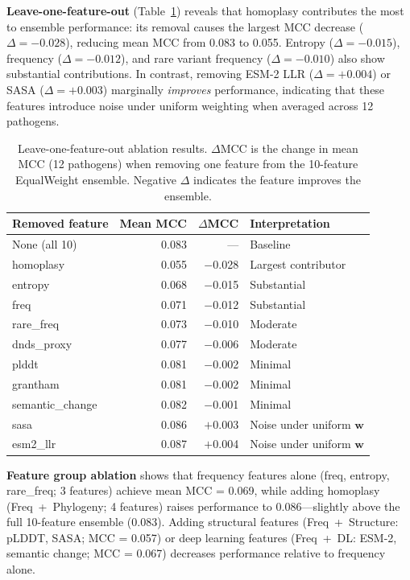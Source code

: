 \textbf{Leave-one-feature-out} (Table~\ref{tab:feature_ablation_adapt}) reveals that homoplasy contributes the most to ensemble performance: its removal causes the largest MCC decrease ($\Delta = -0.028$), reducing mean MCC from 0.083 to 0.055.
Entropy ($\Delta = -0.015$), frequency ($\Delta = -0.012$), and rare variant frequency ($\Delta = -0.010$) also show substantial contributions.
In contrast, removing ESM-2 LLR ($\Delta = +0.004$) or SASA ($\Delta = +0.003$) marginally \textit{improves} performance, indicating that these features introduce noise under uniform weighting when averaged across 12 pathogens.

\begin{table}[htbp]
\centering
\caption{Leave-one-feature-out ablation results. $\Delta$MCC is the change in mean MCC (12 pathogens) when removing one feature from the 10-feature EqualWeight ensemble. Negative $\Delta$ indicates the feature improves the ensemble.}
\label{tab:feature_ablation_adapt}
\footnotesize
\begin{tabular}{lrrl}
\toprule
\textbf{Removed feature} & \textbf{Mean MCC} & $\Delta$\textbf{MCC} & \textbf{Interpretation} \\
\midrule
None (all 10)       & 0.083 & ---     & Baseline \\
\midrule
homoplasy           & 0.055 & $-$0.028 & Largest contributor \\
entropy             & 0.068 & $-$0.015 & Substantial \\
freq                & 0.071 & $-$0.012 & Substantial \\
rare\_freq          & 0.073 & $-$0.010 & Moderate \\
dnds\_proxy         & 0.077 & $-$0.006 & Moderate \\
plddt               & 0.081 & $-$0.002 & Minimal \\
grantham            & 0.081 & $-$0.002 & Minimal \\
semantic\_change    & 0.082 & $-$0.001 & Minimal \\
sasa                & 0.086 & $+$0.003 & Noise under uniform $\mathbf{w}$ \\
esm2\_llr           & 0.087 & $+$0.004 & Noise under uniform $\mathbf{w}$ \\
\bottomrule
\end{tabular}
\end{table}

\textbf{Feature group ablation} shows that frequency features alone (freq, entropy, rare\_freq; 3 features) achieve mean MCC = 0.069, while adding homoplasy (Freq~+~Phylogeny; 4 features) raises performance to 0.086---slightly above the full 10-feature ensemble (0.083).
Adding structural features (Freq~+~Structure: pLDDT, SASA; MCC = 0.057) or deep learning features (Freq~+~DL: ESM-2, semantic change; MCC = 0.067) decreases performance relative to frequency alone.

